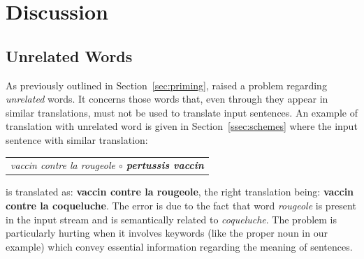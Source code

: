 \begin{table}[ht]
\begin{center}
\end{center}
  \caption{Translation performance for the \texttt{NEWS} and \texttt{WIKI} domain test sets using similar sentences retrieved from parallel data (par) and from both parallel and monolingual (par+mon) data. The first two rows correspond to experiments already shown in Table~\ref{tab:results1}.}
  \label{tab:results2}
\end{table}

\section{Discussion}
\label{sec:discussion}

\subsection*{Unrelated Words} 

As previously outlined in Section~\ref{sec:priming}, \citet{xu20boosting} raised a problem regarding {\em unrelated} words. 
It concerns those words that, even through they appear in similar translations, must not be used to translate input sentences. 
An example of translation with unrelated word is given in Section~\ref{ssec:schemes}
%
where the input sentence with similar translation:
\begin{center}
\begin{tabular}{c}
\it vaccin contre la rougeole $\circ$ {\bf pertussis vaccin} \\
\end{tabular}
\end{center}
\noindent is translated as: {\bf vaccin contre la rougeole}, 
the right translation being: {\bf vaccin contre la coqueluche}.
The error is due to the fact that word \textit{rougeole} is present in the input stream and is semantically related to \textit{coqueluche}.
The problem is particularly hurting when it involves keywords (like the proper noun in our example) which convey essential information regarding the meaning of sentences.

